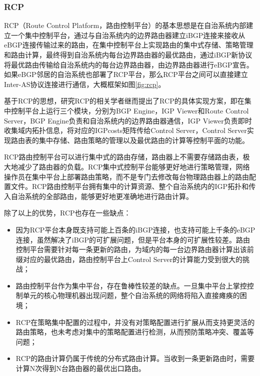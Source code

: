 \subsubsection{RCP\cite{Feamster2004The}}
RCP（Route Control Platform，路由控制平台）的基本思想是在自治系统内部建立一个集中控制平台，通过与自治系统内的边界路由器建立iBGP连接来接收从eBGP连接传输过来的路由，在集中控制平台上实现路由的集中式存储、策略管理和路由计算，最终得到自治系统内每台边界路由器的最优路由，通过iBGP新协议将最优路由传输给自治系统内的每台边界路由器，由边界路由器进行eBGP宣告。如果eBGP邻居的自治系统也部署了RCP平台，那么RCP平台之间可以直接建立Inter-AS协议连接进行通信，大概框架如图\ref{fig:rcp}。

基于RCP的思想，研究RCP的相关学者继而提出了RCP的具体实现方案\cite{Caldwell2005Design}，即在集中控制平台上运行三个模块，分别为BGP Engine，IGP Viewer和Route Control Server，BGP Engine负责和自治系统内的边界路由器通信，IGP Viewer负责即时收集域内拓扑信息，将对应的IGPcosts矩阵传给Control Server，Control Server实现路由表的集中存储、路由策略的管理以及最优路由的计算等控制平面的功能。

RCP路由控制平台可以进行集中式的路由存储，路由器上不需要存储路由表，极大地减少了路由器的负载。RCP集中式控制平台能够更好地进行策略管理，网络操作员在集中平台上部署路由策略，而不是专门去修改每台物理路由器上的路由配置文件\cite{journals/network/CaesarR05}。RCP路由控制平台拥有集中的计算资源、整个自治系统内的IGP拓扑和传入自治系统的全部路由，能够更好地更准确地进行路由计算。

除了以上的优势，RCP也存在一些缺点\cite{Feamster2004The}：
\begin{itemize}
    \item 因为RCP平台本身既支持可能上百条的iBGP连接，也支持可能上千条的eBGP连接，虽然解决了iBGP的可扩展问题，但是平台本身的可扩展性较差。路由控制平台需要针对每一条更新的路由，为域内的每一台边界路由器计算出该前缀对应的最优路由，路由控制平台上Control Server的计算能力受到很大的挑战；
    \item 路由控制平台作为集中平台，存在鲁棒性较差的缺点。一旦集中平台上掌控控制单元的核心物理机器出现问题，整个自治系统的网络将陷入直接瘫痪的困境；
    \item RCP在策略集中配置的过程中，并没有对策略配置进行扩展从而支持更灵活的路由策略\cite{journals/jsac/WangAR09}，也未考虑对集中的策略配置进行检测，从而预防策略冲突、覆盖等问题；
    \item RCP的路由计算仍属于传统的分布式路由计算。当收到一条更新路由时，需要计算N次得到N台路由器的最优出口路由。
\end{itemize}

